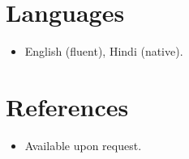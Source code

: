 \documentclass[11pt,a4paper,sans]{moderncv}
\begin{document}

\section{Languages}
\vspace{1pt}
\begin{itemize}
\item English (fluent), Hindi (native).
\end{itemize}


\section{References}
\vspace{1pt}
\begin{itemize}
\item{Available upon request.}
\end{itemize}
\end{document}
